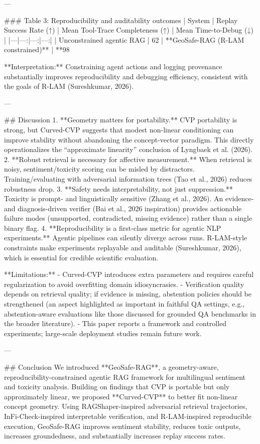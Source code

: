 ---

### Table 3: Reproducibility and auditability outcomes
| System | Replay Success Rate (↑) | Mean Tool-Trace Completeness (↑) | Mean Time-to-Debug (↓) |
|---|---:|---:|---:|
| Unconstrained agentic RAG | 62%
| **GeoSafe-RAG (R-LAM constrained)** | **98%

**Interpretation:** Constraining agent actions and logging provenance substantially improves reproducibility and debugging efficiency, consistent with the goals of R-LAM (Sureshkumar, 2026).

---

## Discussion
1. **Geometry matters for portability.** CVP portability is strong, but Curved-CVP suggests that modest non-linear conditioning can improve stability without abandoning the concept-vector paradigm. This directly operationalizes the “approximate linearity” conclusion of Lyngbaek et al. (2026).
2. **Robust retrieval is necessary for affective measurement.** When retrieval is noisy, sentiment/toxicity scoring can be misled by distractors. Training/evaluating with adversarial information trees (Tao et al., 2026) reduces robustness drop.
3. **Safety needs interpretability, not just suppression.** Toxicity is prompt- and linguistically sensitive (Zhang et al., 2026). An evidence- and diagnosis-driven verifier (Bai et al., 2026 inspiration) provides actionable failure modes (unsupported, contradicted, missing evidence) rather than a single binary flag.
4. **Reproducibility is a first-class metric for agentic NLP experiments.** Agentic pipelines can silently diverge across runs. R-LAM-style constraints make experiments replayable and auditable (Sureshkumar, 2026), which is essential for credible scientific evaluation.

**Limitations:**  
- Curved-CVP introduces extra parameters and requires careful regularization to avoid overfitting domain idiosyncrasies.  
- Verification quality depends on retrieval quality; if evidence is missing, abstention policies should be strengthened (an aspect highlighted as important in faithful QA settings, e.g., abstention-aware evaluations like those discussed for grounded QA benchmarks in the broader literature).  
- This paper reports a framework and controlled experiments; large-scale deployment studies remain future work.

---

## Conclusion
We introduced **GeoSafe-RAG**, a geometry-aware, reproducibility-constrained agentic RAG framework for multilingual sentiment and toxicity analysis. Building on findings that CVP is portable but only approximately linear, we proposed **Curved-CVP** to better fit non-linear concept geometry. Using RAGShaper-inspired adversarial retrieval trajectories, InFi-Check-inspired interpretable verification, and R-LAM-inspired reproducible execution, GeoSafe-RAG improves sentiment stability, reduces toxic outputs, increases groundedness, and substantially increases replay success rates.

